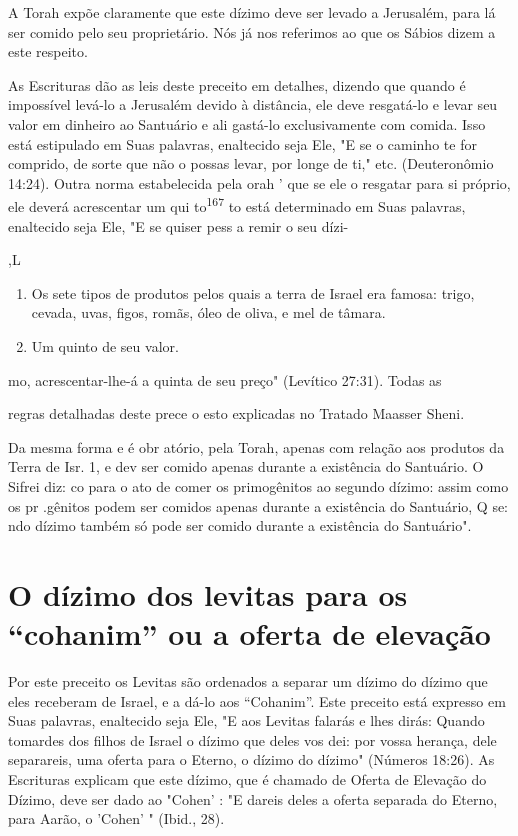 A Torah expõe claramente que este dízimo deve ser levado a Jerusa­lém,
para lá ser comido pelo seu proprietário. Nós já nos referimos ao que os
Sábios dizem a este respeito.

As Escrituras dão as leis deste preceito em detalhes, dizendo que
quan­do é impossível levá-lo a Jerusalém devido à distância, ele deve
resgatá-lo e le­var seu valor em dinheiro ao Santuário e ali gastá-lo
exclusivamente com comi­da. Isso está estipulado em Suas palavras,
enaltecido seja Ele, "E se o caminho te for comprido, de sorte que não o
possas levar, por longe de ti," etc. (Deuteronômio 14:24). Outra norma
estabelecida pela orah ' que se ele o res­gatar para si próprio, ele
deverá acrescentar um qui to\textsuperscript{167} to está determi­nado
em Suas palavras, enaltecido seja Ele, "E se quiser pess a remir o seu
dízi-

{,L}


\begin{enumerate}
\def\labelenumi{\arabic{enumi}.}
\setcounter{enumi}{165}
\item
 
 Os sete tipos de produtos pelos quais a terra de Israel era famosa:
 trigo, cevada, uvas, figos, romãs, óleo de oliva, e mel de tâmara.
 
\item
 
 Um quinto de seu valor.
 
\end{enumerate}

mo, acrescentar-lhe-á a quinta de seu preço" (Levítico 27:31). Todas as

regras detalhadas deste prece o esto explicadas no Tratado Maasser
Sheni.

Da mesma forma e é obr atório, pela Torah, apenas com relação aos
produtos da Terra de Isr. 1, e dev ser comido apenas durante a
existência do Santuário. O Sifrei diz: co para o ato de comer os
primogênitos ao segundo dízimo: assim como os pr .gênitos podem ser
comidos apenas du­rante a existência do Santuário, Q se: ndo dízimo
também só pode ser comido durante a existência do Santuário".

\section{O dízimo dos levitas para os ``cohanim'' ou a oferta de elevação}

Por este preceito os Levitas são ordenados a separar um dízimo do dízimo
que eles receberam de Israel, e a dá-lo aos ``Cohanim''. Este preceito
está expresso em Suas palavras, enaltecido seja Ele, "E aos Levitas
falarás e lhes dirás: Quando tomardes dos filhos de Israel o dízimo que
deles vos dei: por vossa herança, dele separareis, uma oferta para o
Eterno, o dízimo do dízimo" (Números 18:26). As Escrituras explicam que
este dízimo, que é chamado de Oferta de Elevação do Dízimo, deve ser
dado ao "Cohen' : "E dareis deles a oferta separada do Eterno, para
Aarão, o 'Cohen' " (Ibid., 28).

